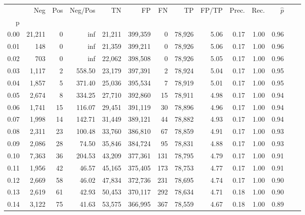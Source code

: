 \begin{tabular}{rrrrrrrrrrrrrr}
\toprule
{} &     Neg &    Pos & Neg/Pos &       TN &       FP &      FN &      TP & FP/TP & Prec. &  Rec. & $\hat{p}$ \\
p    &         &        &         &          &          &         &         &       &       &       &           \\
\midrule
0.00 &  21,211 &      0 &     inf &   21,211 &  399,359 &       0 &  78,926 &  5.06 &  0.17 &  1.00 &      0.96 \\
0.01 &     148 &      0 &     inf &   21,359 &  399,211 &       0 &  78,926 &  5.06 &  0.17 &  1.00 &      0.96 \\
0.02 &     703 &      0 &     inf &   22,062 &  398,508 &       0 &  78,926 &  5.05 &  0.17 &  1.00 &      0.96 \\
0.03 &   1,117 &      2 &  558.50 &   23,179 &  397,391 &       2 &  78,924 &  5.04 &  0.17 &  1.00 &      0.95 \\
0.04 &   1,857 &      5 &  371.40 &   25,036 &  395,534 &       7 &  78,919 &  5.01 &  0.17 &  1.00 &      0.95 \\
0.05 &   2,674 &      8 &  334.25 &   27,710 &  392,860 &      15 &  78,911 &  4.98 &  0.17 &  1.00 &      0.94 \\
0.06 &   1,741 &     15 &  116.07 &   29,451 &  391,119 &      30 &  78,896 &  4.96 &  0.17 &  1.00 &      0.94 \\
0.07 &   1,998 &     14 &  142.71 &   31,449 &  389,121 &      44 &  78,882 &  4.93 &  0.17 &  1.00 &      0.94 \\
0.08 &   2,311 &     23 &  100.48 &   33,760 &  386,810 &      67 &  78,859 &  4.91 &  0.17 &  1.00 &      0.93 \\
0.09 &   2,086 &     28 &   74.50 &   35,846 &  384,724 &      95 &  78,831 &  4.88 &  0.17 &  1.00 &      0.93 \\
0.10 &   7,363 &     36 &  204.53 &   43,209 &  377,361 &     131 &  78,795 &  4.79 &  0.17 &  1.00 &      0.91 \\
0.11 &   1,956 &     42 &   46.57 &   45,165 &  375,405 &     173 &  78,753 &  4.77 &  0.17 &  1.00 &      0.91 \\
0.12 &   2,669 &     58 &   46.02 &   47,834 &  372,736 &     231 &  78,695 &  4.74 &  0.17 &  1.00 &      0.90 \\
0.13 &   2,619 &     61 &   42.93 &   50,453 &  370,117 &     292 &  78,634 &  4.71 &  0.18 &  1.00 &      0.90 \\
0.14 &   3,122 &     75 &   41.63 &   53,575 &  366,995 &     367 &  78,559 &  4.67 &  0.18 &  1.00 &      0.89 \\

\end{tabular}
